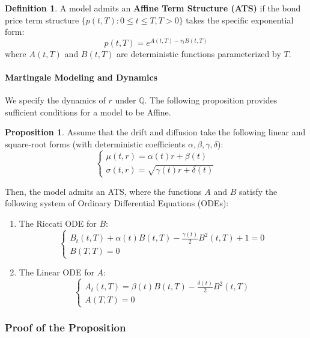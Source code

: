 \documentclass[12pt,a4paper]{article}
\theoremstyle{definition}
\newtheorem{definition}{Definition}[section]
\newtheorem{proposition}{Proposition}[section]
\newcommand{\Q}{\mathbb{Q}}
\begin{document}
\begin{definition}
A model admits an \textbf{Affine Term Structure (ATS)} if the bond price term structure $\{p(t,T): 0 \leq t \leq T, T > 0\}$ takes the specific exponential form:
\[
p(t,T) = e^{A(t,T) - r_t B(t,T)}
\]
where $A(t,T)$ and $B(t,T)$ are deterministic functions parameterized by $T$.
\end{definition}

\paragraph{Martingale Modeling and Dynamics}

We specify the dynamics of $r$ under $\Q$. The following proposition provides sufficient conditions for a model to be Affine.

\begin{proposition}
Assume that the drift and diffusion take the following linear and square-root forms (with deterministic coefficients $\alpha,\beta,\gamma,\delta$):
\[
\begin{cases}
\mu(t,r) = \alpha(t)r + \beta(t) \\
\sigma(t,r) = \sqrt{\gamma(t)r + \delta(t)}
\end{cases}
\]

Then, the model admits an ATS, where the functions $A$ and $B$ satisfy the following system of Ordinary Differential Equations (ODEs):

\begin{enumerate}
\item The Riccati ODE for $B$:
\[
\begin{cases}
B_t(t,T) + \alpha(t)B(t,T) - \frac{\gamma(t)}{2}B^2(t,T) + 1 = 0 \\
B(T,T) = 0
\end{cases}
\]

\item The Linear ODE for $A$:
\[
\begin{cases}
A_t(t,T) = \beta(t)B(t,T) - \frac{\delta(t)}{2}B^2(t,T) \\
A(T,T) = 0
\end{cases}
\tag{$*$}
\]
\end{enumerate}
\end{proposition}

\subsubsection{Proof of the Proposition}
\end{document}
